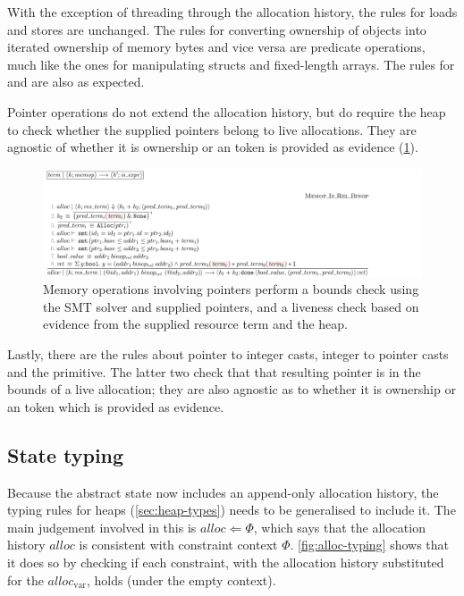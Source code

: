 With the exception of threading through the allocation history, the rules for
loads and stores are unchanged. The rules for converting ownership of objects
into iterated ownership of memory bytes and vice versa are predicate
operations, much like the ones for manipulating structs and fixed-length
arrays. The rules for  and
 are also as expected.

Pointer operations do not extend the allocation history, but do require the
heap to check whether the supplied pointers belong to live allocations. They
are agnostic of whether it is ownership or an  token is
provided as evidence (\cref{fig:mem-model-dyn-ptr-relop}).

\begin{figure}
    \includegraphics{figures/mem-model-dyn-ptr-relop}
    \caption{Memory operations involving pointers perform a bounds check using
        the SMT solver and supplied pointers, and a liveness check based on
        evidence from the supplied resource term and the heap.}\label{fig:mem-model-dyn-ptr-relop}
\end{figure}

Lastly, there are the rules about pointer to integer casts, integer to pointer
casts and the  primitive. The latter two check that that
resulting pointer is in the bounds of a live allocation; they are also agnostic
as to whether it is ownership or an  token which is provided as
evidence.

\subsection{State typing}

Because the abstract state now includes an append-only allocation history, the
typing rules for heaps (\cref{sec:heap-types}) needs to be generalised to
include it. The main judgement involved in this is $\mathit{alloc} \Leftarrow
\Phi$, which says that the allocation history $\mathit{alloc}$ is consistent
with constraint context $\Phi$. \cref{fig:alloc-typing} shows that it does so
by checking if each constraint, with the allocation history substituted for the
$\mathit{alloc}_\mathrm{var}$, holds (under the empty context).

